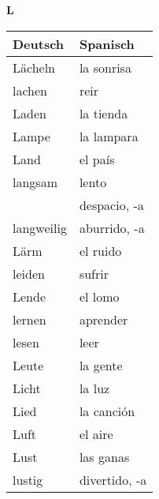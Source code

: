 \begin{flushright}\begin{Huge}\textbf{L}\end{Huge}\end{flushright}

\begin{longtable}{p{} p{}} 
\textbf{Deutsch}     & \textbf{Spanisch}                                       \\ \hline
\hline
\endhead %
Lächeln & la sonrisa\\
lachen & reir\\
Laden & la tienda\\
Lampe & la lampara\\
Land & el país\\
langsam & lento \\
~ & despacio, -a\\ 
langweilig & aburrido, -a\\
Lärm & el ruido \\
leiden & sufrir\\
Lende & el lomo\\
lernen & aprender\\
lesen & leer \\
Leute & la gente\\
Licht & la luz\\
Lied & la canción\\
Luft & el aire\\
Lust & las ganas\\
lustig & divertido, -a\\
\end{longtable}
